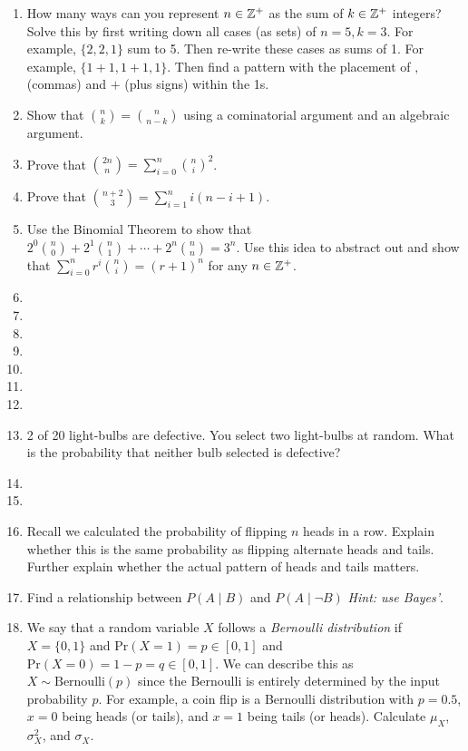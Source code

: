 \documentclass[main.tex]{subfiles}
\begin{document}
\begin{enumerate}
	\item How many ways can you represent \(n \in \mathbb{Z}^+\) as the sum of \(k \in \mathbb{Z}^+\) integers? Solve this by first writing down all cases (as sets) of \(n=5,k=3\). For example, \(\{2,2,1\}\) sum to 5. Then re-write these cases as sums of 1. For example, \(\{1+1,1+1,1\}\). Then find a pattern with the placement of \(,\) (commas) and \(+\) (plus signs) within the 1s.
	\item Show that \(\binom{n}{k} =  \binom{n}{n-k}\) using a cominatorial argument and an algebraic argument.
	\item Prove that \(\binom{2n}{n} = \sum_{i=0}^{n} \binom{n}{i}^2\).
	\item Prove that \(\binom{n+2}{3} = \sum_{i=1}^{n} i(n-i+1)\).
	
	\item Use the Binomial Theorem to show that \(2^0\binom{n}{0} + 2^1\binom{n}{1} + \cdots + 2^n\binom{n}{n} = 3^n\). Use this idea to abstract out and show that \(\sum_{i=0}^{n} r^i \binom{n}{i} = (r+1)^n\) for any \(n \in \mathbb{Z}^+\).
	\item %
	\item %
	\item %
	\item %
	\item %
	\item %
	\item %
	\item 2 of 20 light-bulbs are defective. You select two light-bulbs at random. What is the probability that neither bulb selected is defective? %
	\item %
	\item %
	\item Recall we calculated the probability of flipping \(n\) heads in a row. Explain whether this is the same probability as flipping alternate heads and tails. Further explain whether the actual pattern of heads and tails matters.
	\item Find a relationship between \(P(A \mid B)\) and \(P(A \mid \lnot B)\) \textit{Hint: use Bayes'}.
	
	\item We say that a random variable \(X\) follows a \textit{Bernoulli distribution} if \(X = \{0,1\}\) and \(\mathrm{Pr}(X = 1) = p \in [0,1]\) and \(\mathrm{Pr}(X = 0) = 1-p = q \in [0,1]\). We can describe this as \(X \sim \text{Bernoulli}(p)\) since the Bernoulli is entirely determined by the input probability \(p\). For example, a coin flip is a Bernoulli distribution with \(p=0.5\), \(x=0\) being heads (or tails), and \(x=1\) being tails (or heads). Calculate \(\mu_X\), \(\sigma_X^2\), and \(\sigma_X\).
	

\end{enumerate}
\end{document}
